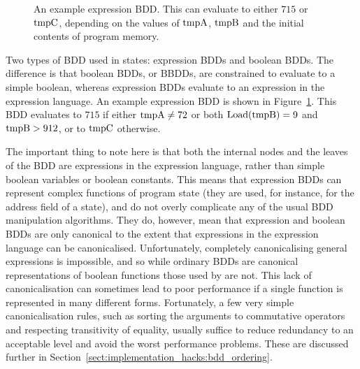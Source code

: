 \begin{figure}
  \begin{center}
  \end{center}
  \caption{An example expression BDD.  This can evaluate to either
    $715$ or $\mathrm{tmpC}$, depending on the values of $\mathrm{tmpA}$,
    $\mathrm{tmpB}$ and the initial contents of program memory.}
  \label{fig:derive:example_expr_bdd}
\end{figure}

Two types of BDD used in {\StateMachine} states: expression BDDs and
boolean BDDs.  The difference is that boolean BDDs, or BBDDs, are
constrained to evaluate to a simple boolean, whereas expression BDDs
evaluate to an expression in the expression language.  An example
expression BDD is shown in Figure~\ref{fig:derive:example_expr_bdd}.
This BDD evaluates to $715$ if either $\mathrm{tmpA} \not= 72$ or both
$\mathrm{Load}(\mathrm{tmpB}) = 9$ and $\mathrm{tmpB} > 912$, or to $\mathrm{tmpC}$
otherwise.  

The important thing to note here is that both the internal nodes and
the leaves of the BDD are expressions in the expression language,
rather than simple boolean variables or boolean constants.  This means
that expression BDDs can represent complex functions of program state
(they are used, for instance, for the address field of a 
state), and do not overly complicate any of the usual BDD manipulation
algorithms.  They do, however, mean that expression and boolean BDDs
are only canonical to the extent that expressions in the expression
language can be canonicalised.  Unfortunately, completely
canonicalising general expressions is impossible, and so while ordinary BDDs are canonical
representations of boolean functions those used by {\technique} are
not.  This lack of canonicalisation can sometimes lead to poor
performance if a single function is represented in many different
forms.  Fortunately, a few very simple canonicalisation rules, such as
sorting the arguments to commutative operators and respecting
transitivity of equality, usually suffice to reduce redundancy to an
acceptable level and avoid the worst performance problems.  These are
discussed further in
Section~\ref{sect:implementation_hacks:bdd_ordering}.

